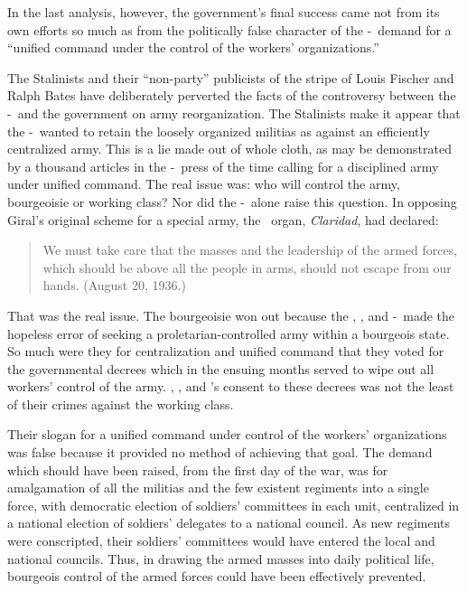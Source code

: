 In the last analysis, however, the government’s final success came not from its own efforts so much as from the politically false character of the \CNT-\POUM\ demand for a ``unified command under the control of the workers’ organizations.''

The Stalinists and their ``non-party'' publicists of the stripe of Louis Fischer and Ralph Bates have deliberately perverted the facts of the controversy between the \POUM-\CNT\ and the government on army reorganization. The Stalinists make it appear that the  \POUM-\CNT\ wanted to retain the loosely organized militias as against an efficiently centralized army. This is a lie made out of whole cloth, as may be demonstrated by a thousand articles in the \POUM-\CNT\ press of the time calling for a disciplined army under unified command. The real issue was: who will control the army, bourgeoisie or working class? Nor did the \POUM-\CNT\ alone raise this question. In opposing Giral’s original scheme for a special army, the \UGT\ organ, \emph{Claridad}, had declared:

\begin{quotation}
  We must take care that the masses and the leadership of the armed forces, which should be above all the people in arms, should not escape from our hands. (August 20, 1936.)
\end{quotation}

That was the real issue. The bourgeoisie won out because the \UGT, \POUM, and \CNT-\FAI\ made the hopeless error of seeking a proletarian-controlled army within a bourgeois state. So much were they for centralization and unified command that they voted for the governmental decrees which in the ensuing months served to wipe out all workers’ control of the army. \UGT, \POUM, and \CNT's consent to these decrees was not the least of their crimes against the working class.

Their slogan for a unified command under control of the workers’ organizations was false because it provided no method of achieving that goal. The demand which should have been raised, from the first day of the war, was for amalgamation of all the militias and the few existent regiments into a single force, with democratic election of soldiers’ committees in each unit, centralized in a national election of soldiers’ delegates to a national council. As new regiments were conscripted, their soldiers’ committees would have entered the local and national councils. Thus, in drawing the armed masses into daily political life, bourgeois control of the armed forces could have been effectively prevented.

